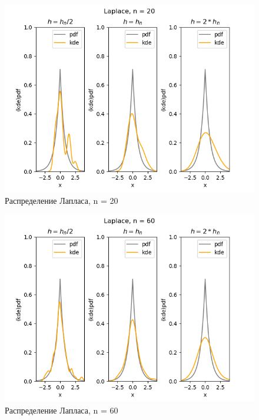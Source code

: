 \documentclass[../body.tex]{subfiles}
\begin{document}
\begin{figure}[H]
	\centering
	\includegraphics[width=\textwidth, height =0.4\textheight]{img/LaplaceKDE n = 20.png}
	\caption{Распределение Лапласа, n = 20}
	\label{fig:laplace_kde_20}
\end{figure}

\begin{figure}[H]
	\centering
	\includegraphics[width=\textwidth, height =0.4\textheight]{img/LaplaceKDE n = 60.png}
	\caption{Распределение Лапласа, n = 60}
	\label{fig:laplace_kde_60}
\end{figure}
\end{document}
